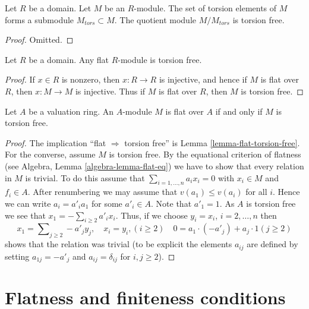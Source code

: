 \begin{lemma}
\label{lemma-torsion}
Let $R$ be a domain. Let $M$ be an $R$-module.
The set of torsion elements of $M$ forms a submodule $M_{tors} \subset M$.
The quotient module $M/M_{tors}$ is torsion free.
\end{lemma}

\begin{proof}
Omitted.
\end{proof}

\begin{lemma}
\label{lemma-flat-torsion-free}
Let $R$ be a domain. Any flat $R$-module is torsion free.
\end{lemma}

\begin{proof}
If $x \in R$ is nonzero, then $x : R \to R$ is injective, and hence if $M$
is flat over $R$, then $x : M \to M$ is injective. Thus if $M$ is flat over
$R$, then $M$ is torsion free.
\end{proof}

\begin{lemma}
\label{lemma-valuation-ring-torsion-free-flat}
Let $A$ be a valuation ring.
An $A$-module $M$ is flat over $A$ if and only if $M$ is torsion free.
\end{lemma}

\begin{proof}
The implication ``flat $\Rightarrow$ torsion free'' is
Lemma \ref{lemma-flat-torsion-free}.
For the converse, assume $M$ is torsion free.
By the equational criterion of flatness (see
Algebra, Lemma \ref{algebra-lemma-flat-eq})
we have to show that every relation in $M$ is trivial. To do this assume that
$\sum_{i = 1, \ldots, n} a_i x_i = 0$ with $x_i \in M$ and $f_i \in A$.
After renumbering we may assume that $v(a_1) \leq v(a_i)$ for all $i$.
Hence we can write $a_i = a'_i a_1$ for some $a'_i \in A$. Note that
$a'_1 = 1$. As $A$ is torsion free we see that
$x_1 = - \sum_{i \geq 2} a'_i x_i$. Thus, if we choose
$y_i = x_i$, $i = 2, \ldots, n$ then
$$
x_1 = \sum\nolimits_{j \geq 2} -a'_j y_j, \quad
x_i = y_i, (i \geq 2)\quad
0 = a_1 \cdot (-a'_j) + a_j \cdot 1 (j \geq 2)
$$
shows that the relation was trivial (to be explicit the elements
$a_{ij}$ are defined by setting $a_{1j} = -a'_j$ and $a_{ij} = \delta_{ij}$
for $i, j \geq 2$).
\end{proof}






\section{Flatness and finiteness conditions}
\label{section-flat-finite}

